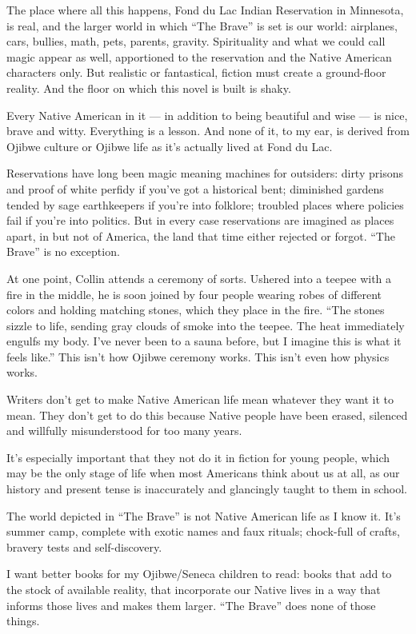 The place where all this happens, Fond du Lac Indian Reservation in
Minnesota, is real, and the larger world in which ``The Brave'' is set
is our world: airplanes, cars, bullies, math, pets, parents, gravity.
Spirituality and what we could call magic appear as well, apportioned to
the reservation and the Native American characters only. But realistic
or fantastical, fiction must create a ground-floor reality. And the
floor on which this novel is built is shaky.

Every Native American in it --- in addition to being beautiful and wise
--- is nice, brave and witty. Everything is a lesson. And none of it, to
my ear, is derived from Ojibwe culture or Ojibwe life as it's actually
lived at Fond du Lac.

Reservations have long been magic meaning machines for outsiders: dirty
prisons and proof of white perfidy if you've got a historical bent;
diminished gardens tended by sage earthkeepers if you're into folklore;
troubled places where policies fail if you're into politics. But in
every case reservations are imagined as places apart, in but not of
America, the land that time either rejected or forgot. ``The Brave'' is
no exception.

At one point, Collin attends a ceremony of sorts. Ushered into a teepee
with a fire in the middle, he is soon joined by four people wearing
robes of different colors and holding matching stones, which they place
in the fire. ``The stones sizzle to life, sending gray clouds of smoke
into the teepee. The heat immediately engulfs my body. I've never been
to a sauna before, but I imagine this is what it feels like.'' This
isn't how Ojibwe ceremony works. This isn't even how physics works.

Writers don't get to make Native American life mean whatever they want
it to mean. They don't get to do this because Native people have been
erased, silenced and willfully misunderstood for too many years.

It's especially important that they not do it in fiction for young
people, which may be the only stage of life when most Americans think
about us at all, as our history and present tense is inaccurately and
glancingly taught to them in school.

The world depicted in ``The Brave'' is not Native American life as I
know it. It's summer camp, complete with exotic names and faux rituals;
chock-full of crafts, bravery tests and self-discovery.

I want better books for my Ojibwe/Seneca children to read: books that
add to the stock of available reality, that incorporate our Native lives
in a way that informs those lives and makes them larger. ``The Brave''
does none of those things.


